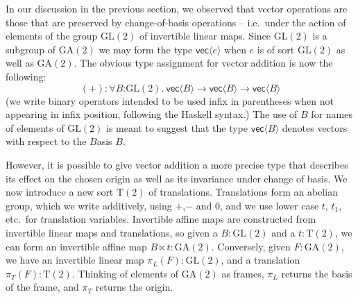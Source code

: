 \documentclass{article}
\newcommand{\GA}{\mathrm{GA}}
\newcommand{\GL}{\mathrm{GL}}
\newcommand{\Transl}{\mathrm{T}}
\begin{document}
In our discussion in the previous section, we observed that vector
operations are those that are preserved by change-of-basis operations
-- i.e.~under the action of elements of the group $\GL(2)$ of
invertible linear maps. Since $\GL(2)$ is a subgroup of $\GA(2)$ we
may form the type $\mathsf{vec}\langle e \rangle$ when $e$ is of sort
$\GL(2)$ as well as $\GA(2)$. The obvious type assignment for vector
addition is now the following:
\begin{displaymath}
  (+) : \forall B\mathord:\GL(2).\ \mathsf{vec}\langle B \rangle \to \mathsf{vec}\langle B \rangle \to \mathsf{vec}\langle B \rangle
\end{displaymath}
(we write binary operators intended to be used infix in parentheses
when not appearing in infix position, following the Haskell
syntax.) The use of $B$ for names of elements of $\GL(2)$ is meant to
suggest that the type $\mathsf{vec}\langle B \rangle$ denotes vectors
with respect to the $B$asis $B$.

However, it is possible to give vector addition a more precise type
that describes its effect on the chosen origin as well as its
invariance under change of basis. We now introduce a new sort
$\Transl(2)$ of translations. Translations form an abelian group,
which we write additively, using $+$,$-$ and $0$, and we use lower
case $t$, $t_1$, etc.~for $t$ranslation variables. Invertible affine
maps are constructed from invertible linear maps and translations, so
given a $B : \GL(2)$ and a $t : \Transl(2)$, we can form an invertible
affine map $B \ltimes t : \GA(2)$. Conversely, given $F : \GA(2)$, we
have an invertible linear map $\pi_L(F) : \GL(2)$, and a translation
$\pi_T(F) : \Transl(2)$. Thinking of elements of $\GA(2)$ as frames,
$\pi_L$ returns the basis of the frame, and $\pi_T$ returns the
origin.
\end{document}
